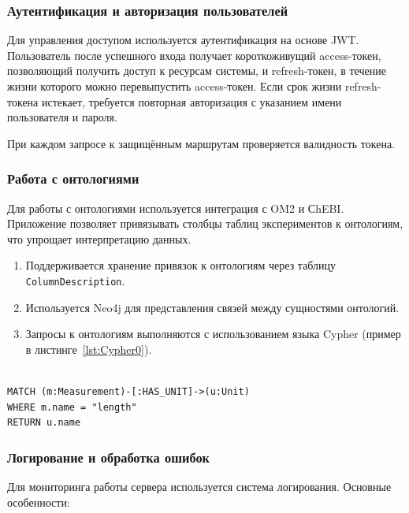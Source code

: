 \subsubsection{Аутентификация и авторизация пользователей}

Для управления доступом используется аутентификация на основе JWT.
Пользователь после успешного входа получает короткоживущий access-токен, позволяющий получить доступ к ресурсам системы, и refresh-токен, в течение жизни которого можно перевыпустить access-токен.
Если срок жизни refresh-токена истекает, требуется повторная авторизация с указанием имени пользователя и пароля.

При каждом запросе к защищённым маршрутам проверяется валидность токена.

\subsubsection{Работа с онтологиями}

Для работы с онтологиями используется интеграция с OM2 и СhEBI.
Приложение позволяет привязывать столбцы таблиц экспериментов к онтологиям, что упрощает интерпретацию данных.

\begin{enumerate}
\item Поддерживается хранение привязок к онтологиям через таблицу \texttt{ColumnDescription}.
\item Используется Neo4j для представления связей между сущностями онтологий.
\item Запросы к онтологиям выполняются с использованием языка Cypher (пример в листинге~\ref{lst:Cypher0}).
\end{enumerate}

\begin{lstlisting}[frame=single, basicstyle=\footnotesize\ttfamily, label={lst:Cypher0}, caption={Пример запроса к Neo4j для поиска онтологических связей},captionpos=b, breaklines=true, breakatwhitespace=true]

MATCH (m:Measurement)-[:HAS_UNIT]->(u:Unit)
WHERE m.name = "length"
RETURN u.name
\end{lstlisting}

\subsubsection{Логирование и обработка ошибок}

Для мониторинга работы сервера используется система логирования.
Основные особенности:

